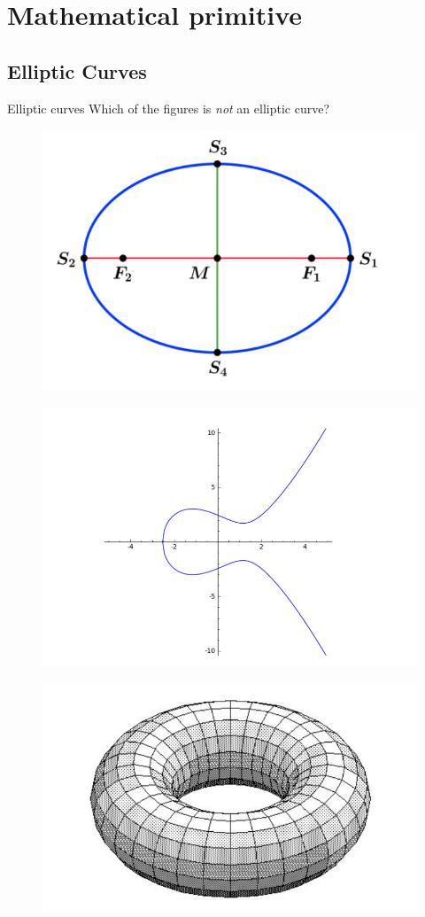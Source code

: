 \documentclass[handout]{beamer}
\begin{document}
\section{Mathematical primitive}

\subsection{Elliptic Curves}

\begin{frame}{Elliptic curves}
	Which of the figures is \textit{not} an elliptic curve?
	\begin{figure}
		\begin{minipage}{0.48\textwidth}
			\centering
			\includegraphics[width=.7\linewidth]{ellipse}
			\label{fig:ellipse}
		\end{minipage}\hfill
		\begin{minipage}{0.48\textwidth}
			\centering
			\includegraphics[width=.7\linewidth]{elliptic_curve}
			\label{fig:elliptic_curve}
		\end{minipage}
	\end{figure}
	\begin{figure}
	\begin{minipage}{0.48\textwidth}
		\centering
		\includegraphics[width=.7\linewidth]{elliptic_curve_c}

\end{minipage}
\end{figure}
\end{frame}
\end{document}
